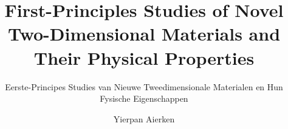 \title{First-Principles Studies of Novel Two-Dimensional Materials and Their Physical Properties}

\subtitle{Eerste-Principes Studies van Nieuwe Tweedimensionale Materialen en Hun Fysische Eigenschappen}

\renewcommand{\submissiontext}{Proefschrift voorgelegd tot het behalen van de graad van doctor in de
wetenschappen aan de Universiteit Antwerpen te verdedigen door}

\author{Yierpan Aierken}








     
